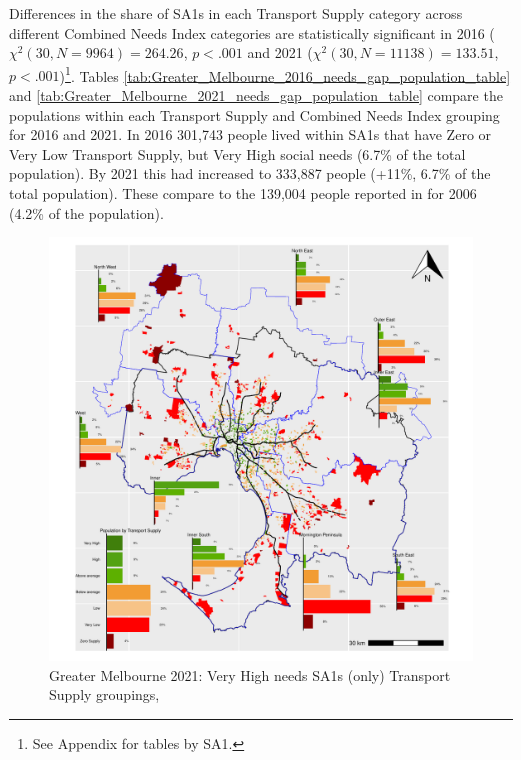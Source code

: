 \documentclass[preprint, 3p,
authoryear]{elsarticle} %
\begin{document}
Differences in the share of SA1s in each Transport Supply category
across different Combined Needs Index categories are statistically
significant in 2016 (\(\chi^2(30, N = 9964) = 264.26\), \(p < .001\) and
2021 (\(\chi^2(30, N = 11138) = 133.51\), \(p < .001\))\footnote{See
  Appendix for tables by SA1.}. Tables
\ref{tab:Greater_Melbourne_2016_needs_gap_population_table} and
\ref{tab:Greater_Melbourne_2021_needs_gap_population_table} compare the
populations within each Transport Supply and Combined Needs Index
grouping for 2016 and 2021. In 2016 301,743 people lived within SA1s
that have Zero or Very Low Transport Supply, but Very High social needs
(6.7\% of the total population). By 2021 this had increased to 333,887
people (+11\%, 6.7\% of the total population). These compare to the
139,004 people reported in \citet{currie2010identifying} for 2006 (4.2\%
of the population).

\begin{figure}
\centering
\includegraphics{ReynoldsCurrieQu2024_files/figure-latex/Greater_Melbourne_2021_needs_gap_map_figure-1.pdf}
\caption{Greater Melbourne 2021: Very High needs SA1s (only) Transport
Supply groupings,}
\end{figure}
\end{document}
